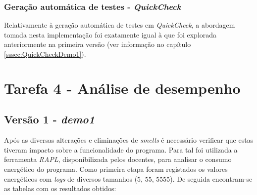 \documentclass[a4paper]{report}
\begin{document}
\subsubsection{Geração automática de testes - \textit{QuickCheck}}
Relativamente à geração automática de testes em \textit{QuickCheck}, a abordagem tomada nesta implementação foi exatamente igual à que foi explorada anteriormente na primeira versão (ver informação no capítulo \ref{sssec:QuickCheckDemo1}).

\section{Tarefa 4 - Análise de desempenho}
\subsection{Versão 1 - \textit{demo1}}
Após as diversas alterações e eliminações de \textit{smells} é necessário verificar que estas tiveram impacto sobre a funcionalidade do programa. Para tal foi utilizada a ferramenta \textit{RAPL}, disponibilizada pelos docentes, para analisar o consumo energético do programa. Como primeira etapa foram registados os valores energéticos com \textit{logs} de diversos tamanhos (5, 55, 5555). De seguida encontram-se as tabelas com os resultados obtidos:
\end{document}
